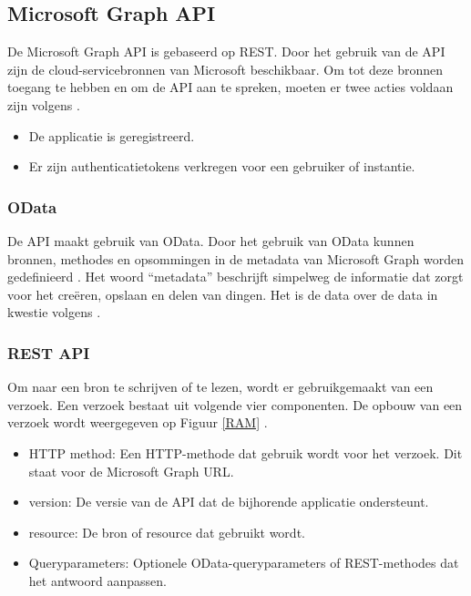 \subsection{Microsoft Graph API}


De Microsoft Graph \Ac{API} is gebaseerd op \Ac{REST}. Door het gebruik van de \ac{API} zijn de cloud-servicebronnen van Microsoft beschikbaar. Om tot deze bronnen toegang te hebben en om de \Ac{API} aan te spreken, moeten er twee acties voldaan zijn volgens \textcite{Microsoft2023vv}.

\begin{itemize}
    \item De applicatie is geregistreerd.
    \item Er zijn authenticatietokens verkregen voor een gebruiker of instantie.
\end{itemize}

\subsubsection{OData}


De \ac{API} maakt gebruik van OData. Door het gebruik van OData kunnen bronnen, methodes en opsommingen in de metadata van Microsoft Graph worden gedefinieerd \autocite{Microsoft2023vv}. Het woord “metadata” beschrijft simpelweg de informatie dat zorgt voor het creëren, opslaan en delen van dingen. Het is de data over de data in kwestie volgens \textcite{Riley2017}.

\subsubsection{REST API}


Om naar een bron te schrijven of te lezen, wordt er gebruikgemaakt van een verzoek. Een verzoek bestaat uit volgende vier componenten. De opbouw van een verzoek wordt weergegeven op Figuur \ref{RAM} \autocite{Microsoft2023vv}.

\begin{itemize}
    \item \ac{HTTP} method: Een \ac{HTTP}-methode dat gebruik wordt voor het verzoek. Dit staat voor de Microsoft Graph \ac{URL}.
    \item version: De versie van de \ac{API} dat de bijhorende applicatie ondersteunt.
    \item resource: De bron of resource dat gebruikt wordt.
    \item Queryparameters: Optionele OData-queryparameters of \Ac{REST}-methodes dat het antwoord aanpassen.
\end{itemize}

